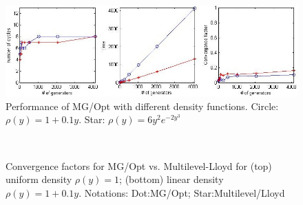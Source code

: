 \documentclass{siamltex}
\begin{document}
\begin{figure}[h]
\centering
  \includegraphics[width=1.0\textwidth]{diff_nonlgt}
  \caption{Performance of MG/Opt with different density functions.  Circle: $\rho(y) = 1+0.1y$.
    Star: $\rho(y) = 6y^{2} e^{-2y^{3}}$}
\label{fig:g_difnon}
\end{figure}

\begin{figure}[h]
\centering
  \\
  \caption{Convergence factors for MG/Opt vs. Multilevel-Lloyd \cite{DE08} for (top)  uniform density $\rho(y) = 1$; (bottom)  linear density $\rho(y) = 1+0.1y$. Notations: Dot:MG/Opt; Star:Multilevel/Lloyd }
\label{fig:uni_ML}
\end{figure}

\end{document}
